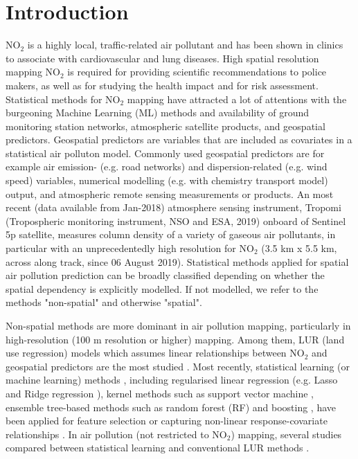 \documentclass{article}
\begin{document}
\section{Introduction}
NO$_2$ is a highly local, traffic-related air pollutant and has been shown in clinics to associate with cardiovascular and lung diseases. High spatial resolution mapping NO$_2$ is required for providing scientific recommendations to police makers, as well as for studying the health impact and for risk assessment. Statistical methods for NO$_2$ mapping have attracted a lot of attentions with the burgeoning Machine Learning (ML) methods and availability of ground monitoring station networks, atmospheric satellite products, and geospatial predictors. Geospatial predictors are variables that are included as covariates in a statistical air polluton model. Commonly used geospatial predictors are for example air emission- (e.g. road networks) and dispersion-related (e.g. wind speed) variables, numerical modelling (e.g. with chemistry transport model) output, and atmospheric remote sensing measurements or products. An most recent (data available from Jan-2018) atmosphere sensing instrument, Tropomi (Tropospheric monitoring instrument, NSO and ESA, 2019) onboard of Sentinel 5p satellite, measures column density of a variety of gaseous air pollutants, in particular with an unprecedentedly high resolution for NO$_2$ (3.5 km x 5.5 km, across along track, since 06 August 2019). Statistical methods applied for spatial air pollution prediction can be broadly classified depending on whether the spatial dependency is explicitly modelled. If not modelled, we refer to the methods "non-spatial" and otherwise "spatial". 

Non-spatial methods are more dominant in air pollution mapping, particularly in high-resolution (100 m resolution or higher) mapping. Among them, LUR (land use regression) models which assumes linear relationships between NO$_2$ and geospatial predictors are the most studied \citep{briggs2000regression,hoek2008review}. Most recently, statistical learning (or machine learning) methods \citep{hastie2009elements}, including regularised linear regression (e.g. Lasso and Ridge regression \citep{James2013introduction}), kernel methods such as support vector machine \citep{svm1999least}, ensemble tree-based methods such as random forest (RF) \citep{breiman2001random} and boosting \citep{chen2016xgboost}, have been applied for feature selection or capturing non-linear response-covariate relationships \citep{luglobal,chen2019comparison}. In air pollution (not restricted to NO$_2$) mapping, several studies compared between statistical learning and conventional LUR methods  \citep{chen2019comparison,kerckhoffs2019performance,luglobal,REN2020105827,machinereview}.
\end{document}
